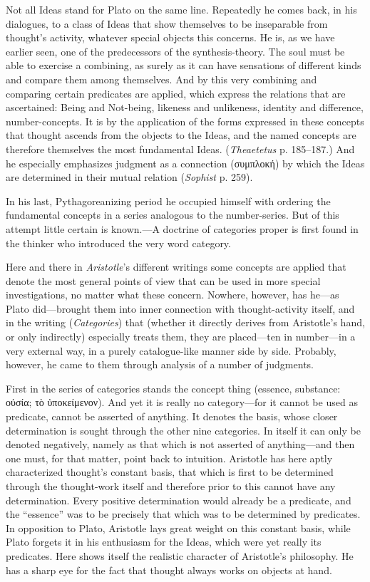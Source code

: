 \documentclass[12pt,a4paper]{book}
\newcommand{\opage}[1]{\marginnote{\footnotesize\textit{[#1]}}}
\begin{document}
Not all Ideas stand for Plato on the same line. Repeatedly he comes back,
in his dialogues, to a class of Ideas that show themselves to be
inseparable from thought's activity, whatever special objects this
concerns. He is, as we have earlier seen, one of the predecessors of the
synthesis-theory. The soul must be able to exercise a combining, as surely
as it can have sensations of different kinds and compare them among
themselves. And by this very combining and comparing certain predicates are
applied, which express the relations that are ascertained: Being and
Not-being, likeness and \opage{141}unlikeness, identity and difference,
number-concepts. It is by the application of the forms expressed in these
concepts that thought ascends from the objects to the Ideas, and the named
concepts are therefore themselves the most fundamental Ideas.
(\emph{Theaetetus} p. 185--187.) And he especially emphasizes judgment as a
connection (συμπλοκή) by which the Ideas are determined in their mutual
relation (\emph{Sophist} p. 259).

In his last, Pythagoreanizing period he occupied himself with ordering the
fundamental concepts in a series analogous to the number-series. But of
this attempt little certain is known.---A doctrine of categories proper is
first found in the thinker who introduced the very word category.

Here and there in \emph{Aristotle}'s different writings some concepts are
applied that denote the most general points of view that can be used in
more special investigations, no matter what these concern. Nowhere,
however, has he---as Plato did---brought them into inner connection with
thought-activity itself, and in the writing (\emph{Categories}) that
(whether it directly derives from Aristotle's hand, or only indirectly)
especially treats them, they are placed---ten in number---in a very
external way, in a purely catalogue-like manner side by side. Probably,
however, he came to them through analysis of a number of judgments.

First in the series of categories stands the concept thing (essence,
substance: οὐσία; τὸ ὑποκείμενον). And yet it is really no category---for
it cannot be used as predicate, cannot be asserted of anything. It denotes
the basis, whose closer determination is sought through the other nine
categories. In itself it can only be denoted negatively, namely as that
which is not asserted of anything---and then one must, for that matter,
point back to intuition. Aristotle has here aptly characterized thought's
constant basis, that which is first to be determined through the
thought-work itself and therefore prior to this cannot have any
determination. Every positive determination would already be a predicate,
and the ``essence'' was to be precisely that which was to be determined by
predicates. In opposition to Plato, Aristotle lays great \opage{142}weight on this
constant basis, while Plato forgets it in his enthusiasm for the Ideas,
which were yet really its predicates. Here shows itself the realistic
character of Aristotle's philosophy. He has a sharp eye for the fact that
thought always works on objects at hand.
\end{document}
